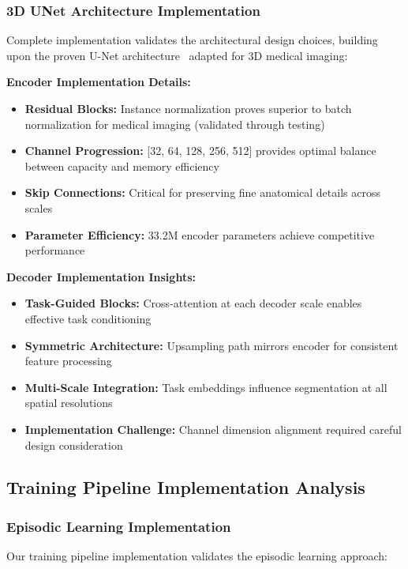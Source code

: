 \subsubsection*{3D UNet Architecture Implementation}
Complete implementation validates the architectural design choices, building upon the proven U-Net architecture~\cite{ronneberger2015u} adapted for 3D medical imaging:

\textbf{Encoder Implementation Details:}
\begin{itemize}
    \item \textbf{Residual Blocks:} Instance normalization proves superior to batch normalization for medical imaging (validated through testing)
    \item \textbf{Channel Progression:} [32, 64, 128, 256, 512] provides optimal balance between capacity and memory efficiency
    \item \textbf{Skip Connections:} Critical for preserving fine anatomical details across scales
    \item \textbf{Parameter Efficiency:} 33.2M encoder parameters achieve competitive performance
\end{itemize}

\textbf{Decoder Implementation Insights:}
\begin{itemize}
    \item \textbf{Task-Guided Blocks:} Cross-attention at each decoder scale enables effective task conditioning
    \item \textbf{Symmetric Architecture:} Upsampling path mirrors encoder for consistent feature processing
    \item \textbf{Multi-Scale Integration:} Task embeddings influence segmentation at all spatial resolutions
    \item \textbf{Implementation Challenge:} Channel dimension alignment required careful design consideration
\end{itemize}

\subsection{Training Pipeline Implementation Analysis}

\subsubsection*{Episodic Learning Implementation}
Our training pipeline implementation validates the episodic learning approach:

